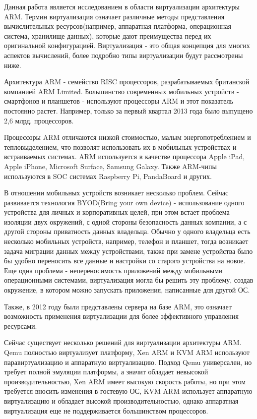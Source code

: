 
Данная работа является исследованием в области виртуализации архитектуры ARM. Термин виртуализация означает различные методы представления вычислительных ресурсов(например, аппаратная платформа, операционная система, хранилище данных), которые дают преимущества перед их оригинальной конфигурацией. Виртуализация - это общая концепция для многих аспектов вычислений, более подробно типы виртуализации будут рассмотрены ниже.

Архитектура ARM - семейство RISC процессоров, разрабатываемых британской компанией ARM Limited. Большинство современных мобильных устройств - смартфонов и планшетов - используют процессоры ARM и этот показатель постоянно растет. Например, только за первый квартал 2013 года было выпущено 2,6 млрд. процессоров\cite{bib:arm_web}.

Процессоры ARM отличаются низкой стоимостью, малым энергопотреблением и тепловыделением, что позволят использовать их в мобильных устройствах и встраиваемых системах. ARM используется в качестве процессора Apple iPad, Apple iPhone, Microsoft Surface, Samsung Galaxy. Также ARM-чипы используются в SOC системах Raspberry Pi, PandaBoard и других.

В отношении мобильных устройств возникает несколько проблем. Сейчас развивается технология BYOD(Bring your own device) - использование одного устройства для личных и корпоративных целей, при этом встает проблема изоляции двух окружений, с одной стороны безопасность данных компании, а с другой стороны приватность данных владельца. Обычно у одного владельца есть несколько мобильных устройств, например, телефон и планшет, тогда возникает задача миграции данных между устройствами, также при замене устройства было бы удобно переносить все данные и настройки со старого устройства на новое. Еще одна проблема - непереносимость приложений между мобильными операционными системами, виртуализация могла бы решить эту проблему, создав окружение, в котором можно запускать приложения, написанные для другой ОС.

Также, в 2012 году были представлены сервера на базе ARM, это означает возможность применения виртуализации для более эффективного управления ресурсами.

Сейчас существует несколько решений для виртуализации архитектуры ARM. Qemu полностью виртуализует платформу, Xen ARM и KVM ARM используют паравиртуализацию и аппаратную виртуализацию. Подход Qemu универсален, но требует полной эмуляции платформы, а значит обладает невысокой производительностью, Xen ARM имеет высокую скорость работы, но при этом требуется вносить изменения в гостевую ОС, KVM ARM использует аппаратную виртуализацию и обладает высокой производительностью, однако аппаратная виртуализация еще не поддерживается большинством процессоров.

